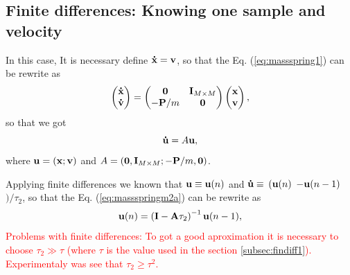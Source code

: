 \documentclass[11pt,twoside,a4paper]{article}
\newcommand{\MATRIX}[1]{\mathbf{\uppercase{#1}}}
\newcommand{\VECTOR}[1]{\mathbf{\lowercase{#1}}}
\begin{document}
\subsection{Finite differences: Knowing one sample and velocity}
In this case, It is necessary define $\VECTOR{\dot{X}} = \VECTOR{V}$, so that
the Eq. (\ref{eq:massspring1}) can be rewrite as
\begin{equation}\label{eq:massspringm2}
\left(
\begin{matrix}
 \VECTOR{\dot{X}}\\
 \VECTOR{\dot{V}}\\
\end{matrix}\right)=
\left(
\begin{matrix}
 \mathbf{0}    & \MATRIX{I}_{M \times M} \\
 -\MATRIX{P}/m & \mathbf{0} \\
\end{matrix}\right)
\left(
\begin{matrix}
 \VECTOR{X}\\
 \VECTOR{V}\\
\end{matrix}\right),
\end{equation}
so that we got
\begin{equation}\label{eq:massspringm2a}
 \VECTOR{\dot{U}}=A\VECTOR{U},
\end{equation}
where $\VECTOR{U}= \left( \VECTOR{X} ; \VECTOR{V} \right)$ and
$A=\left( \mathbf{0} , \MATRIX{I}_{M \times M} ; -\MATRIX{P}/m , \mathbf{0} \right)$.

Applying finite differences we known that $\VECTOR{U} \equiv \VECTOR{U}(n)$ and
$\VECTOR{\dot{U}} \equiv$ $( \VECTOR{U}(n)$ $-\VECTOR{U}(n-1)$ $ ) /{\tau_2}$, 
so that the Eq. (\ref{eq:massspringm2a}) can be rewrite as
\begin{equation}\label{eq:massspring2m2}
 \VECTOR{U}(n) = \left( \mathbf{I} -\mathbf{A}\tau_2 \right)^{-1} \VECTOR{U}(n-1),
\end{equation}
\textcolor{red}{Problems  with finite differences: To got a good aproximation it 
is necessary to choose $\tau_2 \gg \tau$ (where $\tau$ is the value used in the section \ref{subsec:findiff1}). Experimentaly was see that $\tau_2 \geq \tau^2$.}
\end{document}
